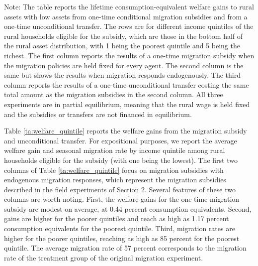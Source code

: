 \documentclass[12pt,pdftex]{article}
\begin{document}
\begin{table}[h]
\begin{center}
\parbox[c]{6.8in}{%
{\footnotesize  \vspace{0.1cm} Note: The table reports the lifetime consumption-equivalent welfare gains to rural assets with low assets from one-time conditional migration subsidies and from a one-time unconditional transfer. The rows are for different income quintiles of the rural households eligible for the subsidy, which are those in the bottom half of the rural asset distribution, with 1 being the poorest quintile and 5 being the richest. The first column reports the results of a one-time migration subsidy when the migration policies are held fixed for every agent. The second column is the same but shows the results when migration responds endogenously. The third column reports the results of a one-time unconditional transfer costing the same total amount as the migration subsidies in the second column. All three experiments are in partial equilibrium, meaning that the rural wage is held fixed and the subsidies or transfers are not financed in equilibrium.}
}
\end{center}
\end{table}


Table \ref{ta:welfare_quintile} reports the welfare gains from the migration subsidy and unconditional transfer. For expositional purposes, we report the average welfare gain and seasonal migration rate by income quintile among rural households eligible for the subsidy (with one being the lowest). The first two columns of Table \ref{ta:welfare_quintile} focus on migration subsidies with endogenous migration responses, which represent the migration subsidies described in the field experiments of Section 2. Several features of these two columns are worth noting. First, the welfare gains for the one-time migration subsidy are modest on average, at 0.44 percent consumption equivalents. Second, gains are higher for the poorer quintiles and reach as high as 1.17 percent consumption equivalents for the poorest quintile. Third, migration rates are higher for the poorer quintiles, reaching as high as 85 percent for the poorest quintile. The average migration rate of 57 percent corresponds to the migration rate of the treatment group of the original migration experiment.
\end{document}
